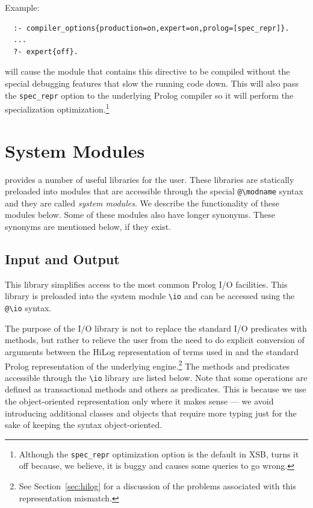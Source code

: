 \documentclass[11pt]{article}
\newcommand{\ERGO}{\mbox{\smaller{\ensuremath{\cal{E}}\smaller{{\sc{RGO}}}}}\xspace}
\newcommand{\FLSYSTEM}{\ERGO}
\newcommand{\bs}{\textbackslash}
\begin{document}
Example:
\begin{verbatim}
  :- compiler_options{production=on,expert=on,prolog=[spec_repr]}.
  ...
  ?- expert{off}.
\end{verbatim}
will cause the module that contains this directive to be compiled without
the special debugging features that slow the running code down. This will
also pass the \texttt{spec\_repr} option to the underlying Prolog compiler
so  it will perform the specialization optimization.\footnote{
  Although the \texttt{spec\_repr} optimization option is the default in
  XSB, \FLSYSTEM turns it off because, we believe, it is buggy and causes some
  \FLSYSTEM queries to go wrong.
  }


\section{\FLSYSTEM System Modules}\label{sec-service-libs}

\FLSYSTEM provides a number of useful libraries for the user.
These libraries are statically preloaded into modules that are accessible
through the special {\tt @\bs{}modname} syntax and they are called
\emph{system modules}.  We describe the functionality of these modules
below. Some of these modules also have longer synonyms.
These synonyms are mentioned below, if they exist.

\subsection{Input and Output}\label{sec-io-mod}

This library simplifies access to the most common Prolog I/O facilities.
This library is preloaded into the system module {\tt \bs{}io} and
can be accessed using the {\tt @\bs{}io} syntax.

The purpose of the I/O library is not to replace the standard I/O predicates
with \FLSYSTEM methods, but rather to relieve the user from the need to do
explicit conversion of arguments between the HiLog representation of terms
used in \FLSYSTEM and the standard Prolog representation of the underlying
engine.\footnote{
  See Section~\ref{sec:hilog} for a discussion of the problems associated
  with this representation mismatch.
  }
The methods and predicates accessible through the {\tt \bs{}io} library are
listed below.  Note that some operations are defined as transactional methods
and others as predicates. This is because we use the object-oriented
representation only where it makes sense --- we avoid introducing
additional classes and objects that require more typing just for the sake
of keeping the syntax object-oriented.
\end{document}
